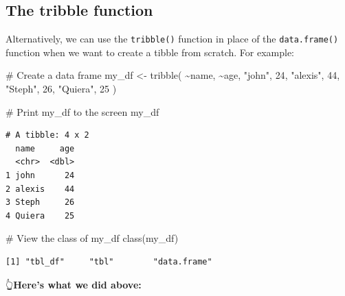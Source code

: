 \documentclass[
  letterpaper,
  DIV=11,
  numbers=noendperiod]{scrreprt}
\newenvironment{Shaded}{\begin{snugshade}}{\end{snugshade}}
\newcommand{\CommentTok}[1]{\textcolor[rgb]{0.37,0.37,0.37}{#1}}
\newcommand{\DecValTok}[1]{\textcolor[rgb]{0.68,0.00,0.00}{#1}}
\newcommand{\FunctionTok}[1]{\textcolor[rgb]{0.28,0.35,0.67}{#1}}
\newcommand{\NormalTok}[1]{\textcolor[rgb]{0.00,0.23,0.31}{#1}}
\newcommand{\OtherTok}[1]{\textcolor[rgb]{0.00,0.23,0.31}{#1}}
\newcommand{\SpecialCharTok}[1]{\textcolor[rgb]{0.37,0.37,0.37}{#1}}
\newcommand{\StringTok}[1]{\textcolor[rgb]{0.13,0.47,0.30}{#1}}
\begin{document}
\subsection{The tribble function}\label{the-tribble-function}

Alternatively, we can use the \texttt{tribble()} function in place of
the \texttt{data.frame()} function when we want to create a tibble from
scratch. For example:

\begin{Shaded}
\begin{Highlighting}[]
\CommentTok{\# Create a data frame}
\NormalTok{my\_df }\OtherTok{\textless{}{-}} \FunctionTok{tribble}\NormalTok{(}
  \SpecialCharTok{\textasciitilde{}}\NormalTok{name,    }\SpecialCharTok{\textasciitilde{}}\NormalTok{age,}
  \StringTok{"john"}\NormalTok{,   }\DecValTok{24}\NormalTok{, }
  \StringTok{"alexis"}\NormalTok{, }\DecValTok{44}\NormalTok{, }
  \StringTok{"Steph"}\NormalTok{,  }\DecValTok{26}\NormalTok{,}
  \StringTok{"Quiera"}\NormalTok{, }\DecValTok{25}
\NormalTok{)}

\CommentTok{\# Print my\_df to the screen}
\NormalTok{my\_df}
\end{Highlighting}
\end{Shaded}

\begin{verbatim}
# A tibble: 4 x 2
  name     age
  <chr>  <dbl>
1 john      24
2 alexis    44
3 Steph     26
4 Quiera    25
\end{verbatim}

\begin{Shaded}
\begin{Highlighting}[]
\CommentTok{\# View the class of my\_df}
\FunctionTok{class}\NormalTok{(my\_df)}
\end{Highlighting}
\end{Shaded}

\begin{verbatim}
[1] "tbl_df"     "tbl"        "data.frame"
\end{verbatim}

👆\textbf{Here's what we did above:}
\end{document}
